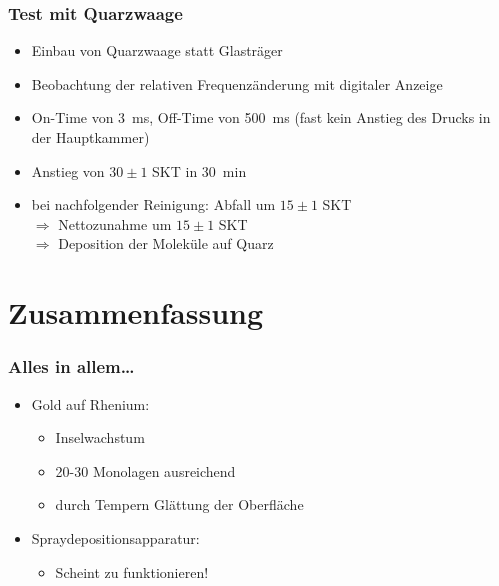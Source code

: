 \documentclass{beamer}
\begin{document}
\begin{frame}
\frametitle{Test mit Quarzwaage}
\begin{itemize}\setlength{\itemsep}{+15pt}
  \item Einbau von Quarzwaage statt Glasträger
  \item Beobachtung der relativen Frequenzänderung mit digitaler Anzeige
  \item On-Time von \SI{3}{ms}, Off-Time von \SI{500}{ms} (fast kein Anstieg des Drucks in der
  Hauptkammer)
  \item Anstieg von $30\pm1$ SKT in \SI{30}{min}
  \item bei nachfolgender Reinigung: Abfall um $15\pm1$ SKT \\
  $\Rightarrow$ Nettozunahme um $15\pm1$ SKT \\
  $\Rightarrow$ Deposition der Moleküle auf Quarz
\end{itemize}
\end{frame}




\section{Zusammenfassung}

\begin{frame}
\frametitle<presentation>{Alles in allem\ldots}

\begin{itemize}\setlength{\itemsep}{+15pt}
  \item Gold auf Rhenium:\vspace{0.5cm}
  		\begin{itemize}\setlength{\itemsep}{+7pt}
  		  \item  Inselwachstum 
  		  \item  20-30 Monolagen ausreichend
  		  \item  durch Tempern Glättung der Oberfläche
  		\end{itemize}
  \item Spraydepositionsapparatur:\vspace{0.5cm}
    	\begin{itemize}
  		  \item  Scheint zu funktionieren!	  
  		\end{itemize}
\end{itemize}
\end{frame}
\end{document}
